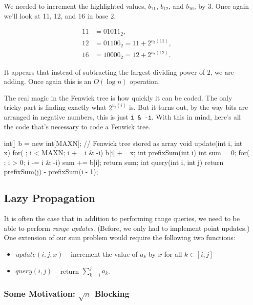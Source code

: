 \documentclass[11pt]{book}
\begin{document}
We needed to increment the highlighted values, $b_{11}$, $b_{12}$, and $b_{16}$, by 3. Once again we'll look at 11, 12, and 16 in base 2.

\begin{align*}
11 &= 01011_2, \\
12 &= 01100_2 = 11 + 2^{v_2(11)}, \\
16 &= 10000_2 = 12 + 2^{v_2(12)}.
\end{align*}

It appears that instead of subtracting the largest dividing power of 2, we are adding. Once again this is an $O(\log{n})$ operation.

The real magic in the Fenwick tree is how quickly it can be coded. The only tricky part is finding exactly what $2^{v_2(i)}$ is. But it turns out, by the way bits are arranged in negative numbers, this is just \texttt{i \& -i}. With this in mind, here's all the code that's necessary to code a Fenwick tree.

\begin{mylstlisting}
int[] b = new int[MAXN]; // Fenwick tree stored as array
void update(int i, int x) {
	for( ; i < MAXN; i += i & -i)
		b[i] += x;
}
int prefixSum(int i) {
	int sum = 0;
	for( ; i > 0; i -= i & -i)
		sum += b[i];
	return sum;
}
int query(int i, int j) {
	return prefixSum(j) - prefixSum(i - 1);
}
\end{mylstlisting}

\subsection{Lazy Propagation}

It is often the case that in addition to performing range queries, we need to be able to perform \textit{range updates}. (Before, we only had to implement point updates.) One extension of our sum problem would require the following two functions:

\begin{itemize}
\item
$update(i, j, x)$ -- increment the value of $a_k$ by $x$ for all $k\in [i,j]$

\item
$query(i, j)$ -- return $\sum_{k=i}^j a_k$.
\end{itemize}

\subsubsection{Some Motivation: $\sqrt{n}$ Blocking}
\end{document}
